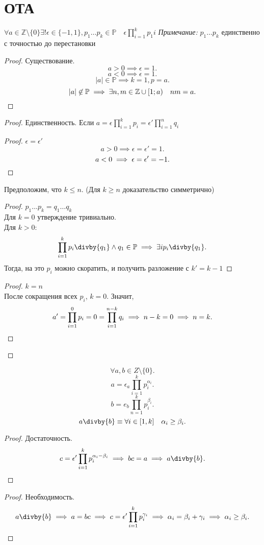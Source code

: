 \documentclass[11pt, oneside]{article}   	%
\begin{document}
\section{ОТА}
    \begin{theorem}
    $\forall{a \in \mathbb{Z}\setminus\{0\}\exists!\epsilon \in \{-1, 1\}, p_1 \ldots p_k \in \mathbb{P} \quad \epsilon\prod\limits_{i=1}^{k}p_1i}$
    \textit{Примечание:} $p_1 \ldots p_k$ единственно с точностью до перестановки\\
    \begin{proof} Существование.
        \[ a > 0 \implies \epsilon=1 .\]
        \[ a < 0 \implies \epsilon=1 .\]
        \[ |a| \in \mathbb{P} \implies k=1, p=a .\]
        \[ |a| \not\in \mathbb{P} \implies \exists{n,m \in \mathbb{Z}\cup \left[1; a\right)}\quad nm=a.\qedhere\]  
    \end{proof}
    \begin{proof} Единственность.
        Если $a=\epsilon\prod_{i=1}^{k}p_i=\epsilon'\prod\limits_{i=1}^{n}q_i$
        \begin{proof}
            $\epsilon = \epsilon'$
            \[ a > 0 \implies \epsilon = \epsilon' = 1 .\]
            \[ a < 0 \implies \epsilon = \epsilon' = -1 .\qedhere\] 
        \end{proof}
        Предположим, что $k \le n$. (Для $k \ge n$ доказательство симметрично)
        \begin{proof} $p_1\ldots p_k = q_1\ldots q_k$\\
            Для $k=0$ утверждение тривиально.\\
            Для $k>0$:
            \[ \prod\limits_{i=1}^{k}p_i\divby{q_1}\wedge{q_1 \in \mathbb{P}} \implies \exists{i} p_i\divby{q_1} .\]
            Тогда, на это $p_i$ можно скоратить, и получить разложение с $k'=k-1$\qedhere
        \end{proof}
        \begin{proof} $k=n$\\
            После сокращения всех $p_i$,  $k=0$. Значит,
            \[ a' = \prod\limits_{i=1}^0p_i = 0 = \prod\limits_{i=1}^{n-k}q_i \implies n-k=0 \implies n=k.\qedhere\]
        \end{proof}
        \let\qed\relax
    \end{proof}
    \end{theorem}
    \begin{tlemma}
        \[ \forall{a, b \in Z}\setminus \{0\}  .\] 
        \[ a = \epsilon_a \prod_{i=1}^{k} p_i^{\alpha_i}  .\]
        \[ b = e_b \prod_{n=1}^{k} p_i^{\beta_i}  .\] 
        \[ a\divby{b} \equiv \forall{i \in \left[1, k\right]}\quad \alpha_i \ge \beta_i.\] 
        \begin{proof} Достаточность.
            \[ c = \epsilon' \prod_{i=1}^{k} p_i^{\alpha_i-\beta_i} \implies bc=a \implies a\divby{b}  .\qedhere\]
        \end{proof}
        \begin{proof} Необходимость.
        \[a\divby{b} \implies a=bc \implies c=\epsilon' \prod_{i=1}^{k} p_i^{\gamma_i} \implies \alpha_i = \beta_i + \gamma_i \implies \alpha_i \ge \beta_i .\qedhere\]
        \end{proof}
    \end{tlemma}
\end{document}
